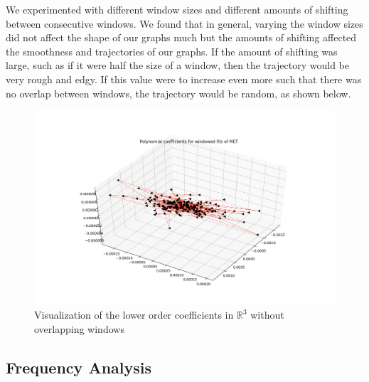 \documentclass[final]{article}
\begin{document}
We experimented with different window sizes and different amounts of shifting
between consecutive windows. We found that in general, varying the window sizes
did not affect the shape of our graphs much but the amounts of shifting
affected the smoothness and trajectories of our graphs. If the amount of
shifting was large, such as if it were half the size of a window, then the
trajectory would be very rough and edgy. If this value were to increase even
more such that there was no overlap between windows, the trajectory would be
random, as shown below.

\begin{figure}[H]
  \centering
  \includegraphics[width=\linewidth]{img/coeff3}
  \caption{Visualization of the lower order coefficients in $\mathbb{R}^3$
  without overlapping windows}
  \label{fig:coeff}
\end{figure}

\subsection{Frequency Analysis}
\end{document}
